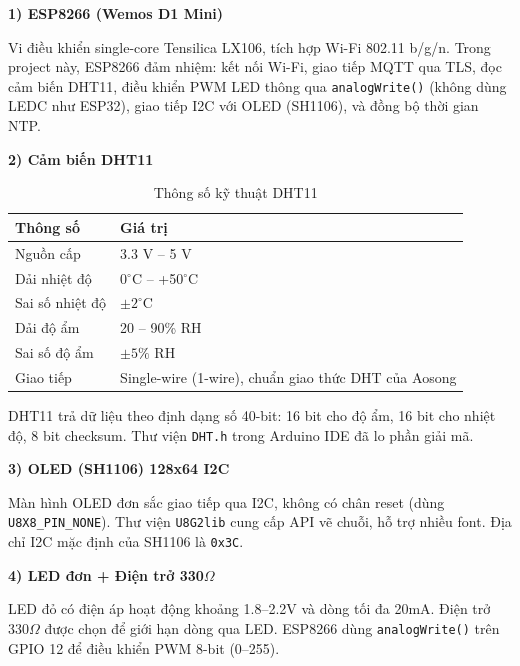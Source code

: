 \documentclass[13pt,a4paper]{article}
\newcommand{\code}[1]{\texttt{#1}}
\begin{document}
\textbf{1) ESP8266 (Wemos D1 Mini)}

Vi điều khiển single-core Tensilica LX106, tích hợp Wi-Fi 802.11 b/g/n. Trong project này, ESP8266 đảm nhiệm: kết nối Wi-Fi, giao tiếp MQTT qua TLS, đọc cảm biến DHT11, điều khiển PWM LED thông qua \code{analogWrite()} (không dùng LEDC như ESP32), giao tiếp I2C với OLED (SH1106), và đồng bộ thời gian NTP.

\textbf{2) Cảm biến DHT11}

\begin{table}[htbp]
    \centering
    \caption{Thông số kỹ thuật DHT11}
    \label{tbl:dht11}
    \begin{tabular}{|L{4cm}|C{5cm}|}
        \hline
        \textbf{Thông số} & \textbf{Giá trị} \\
        \hline
        Nguồn cấp & 3.3 V -- 5 V \\
        \hline
        Dải nhiệt độ & 0$^\circ$C -- +50$^\circ$C \\
        \hline
        Sai số nhiệt độ & $\pm2^\circ$C \\
        \hline
        Dải độ ẩm & 20 -- 90\% RH \\
        \hline
        Sai số độ ẩm & $\pm5\%$ RH \\
        \hline
        Giao tiếp & Single-wire (1-wire), chuẩn giao thức DHT của Aosong \\
        \hline
    \end{tabular}
\end{table}

DHT11 trả dữ liệu theo định dạng số 40-bit: 16 bit cho độ ẩm, 16 bit cho nhiệt độ, 8 bit checksum. Thư viện \code{DHT.h} trong Arduino IDE đã lo phần giải mã.

\textbf{3) OLED (SH1106) 128x64 I2C}

Màn hình OLED đơn sắc giao tiếp qua I2C, không có chân reset (dùng \code{U8X8\_PIN\_NONE}). Thư viện \code{U8G2lib} cung cấp API vẽ chuỗi, hỗ trợ nhiều font. Địa chỉ I2C mặc định của SH1106 là \code{0x3C}.

\textbf{4) LED đơn + Điện trở 330$\Omega$}

LED đỏ có điện áp hoạt động khoảng 1.8--2.2V và dòng tối đa 20mA. Điện trở 330$\Omega$ được chọn để giới hạn dòng qua LED. ESP8266 dùng \code{analogWrite()} trên GPIO 12 để điều khiển PWM 8-bit (0--255).

\end{document}
